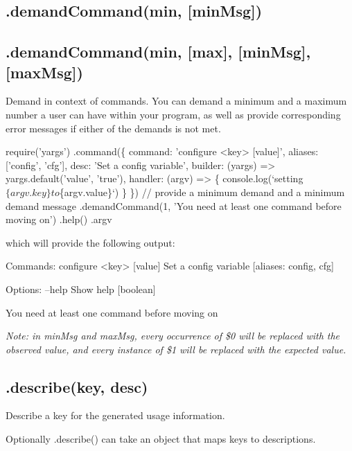 \subsection*{\label{_demandCommand}%
.demand\+Command(min, \mbox{[}min\+Msg\mbox{]}) }

\subsection*{.demand\+Command(min, \mbox{[}max\mbox{]}, \mbox{[}min\+Msg\mbox{]}, \mbox{[}max\+Msg\mbox{]}) }

Demand in context of commands. You can demand a minimum and a maximum number a user can have within your program, as well as provide corresponding error messages if either of the demands is not met. 
\begin{DoxyCode}
require('yargs')
  .command(\{
    command: 'configure <key> [value]',
    aliases: ['config', 'cfg'],
    desc: 'Set a config variable',
    builder: (yargs) => yargs.default('value', 'true'),
    handler: (argv) => \{
      console.log(`setting $\{argv.key\} to $\{argv.value\}`)
    \}
  \})
  // provide a minimum demand and a minimum demand message
  .demandCommand(1, 'You need at least one command before moving on')
  .help()
  .argv
\end{DoxyCode}
 which will provide the following output\+: 
\begin{DoxyCode}
Commands:
  configure <key> [value]  Set a config variable         [aliases: config, cfg]

Options:
  --help  Show help                                                   [boolean]

You need at least one command before moving on
\end{DoxyCode}


{\itshape Note\+: in {\ttfamily min\+Msg} and {\ttfamily max\+Msg}, every occurrence of {\ttfamily \$0} will be replaced with the observed value, and every instance of {\ttfamily \$1} will be replaced with the expected value.}

\subsection*{\label{_describe}%
.describe(key, desc) }

Describe a {\ttfamily key} for the generated usage information.

Optionally {\ttfamily .describe()} can take an object that maps keys to descriptions.

